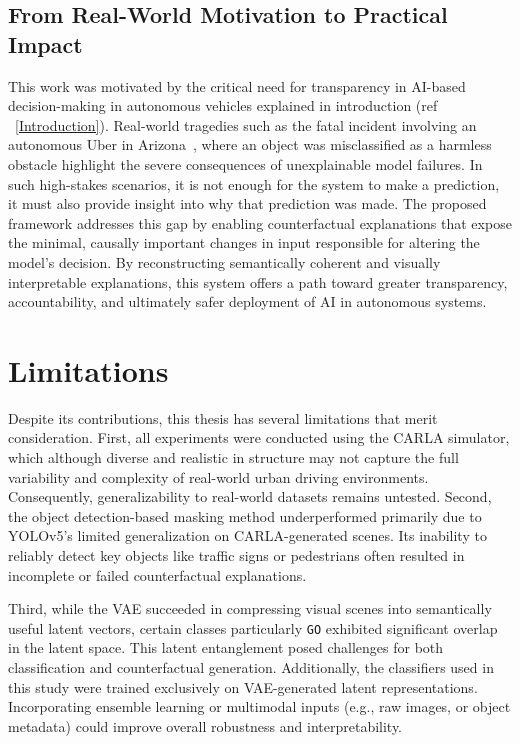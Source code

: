 \subsection{From Real-World Motivation to Practical Impact}
This work was motivated by the critical need for transparency in AI-based decision-making in autonomous vehicles explained in introduction (ref ~\ref{Introduction}). Real-world tragedies such as the fatal incident involving an autonomous Uber in Arizona~\autocite{marshall2019uber}, where an object was misclassified as a harmless obstacle highlight the severe consequences of unexplainable model failures. In such high-stakes scenarios, it is not enough for the system to make a prediction, it must also provide insight into why that prediction was made. The proposed framework addresses this gap by enabling counterfactual explanations that expose the minimal, causally important changes in input responsible for altering the model's decision. By reconstructing semantically coherent and visually interpretable explanations, this system offers a path toward greater transparency, accountability, and ultimately safer deployment of AI in autonomous systems.




\section{Limitations} \label{sec:limitations}
Despite its contributions, this thesis has several limitations that merit consideration. First, all experiments were conducted using the CARLA simulator, which although diverse and realistic in structure may not capture the full variability and complexity of real-world urban driving environments. Consequently, generalizability to real-world datasets remains untested. Second, the object detection-based masking method underperformed primarily due to YOLOv5’s limited generalization on CARLA-generated scenes. Its inability to reliably detect key objects like traffic signs or pedestrians often resulted in incomplete or failed counterfactual explanations.

Third, while the VAE succeeded in compressing visual scenes into semantically useful latent vectors, certain classes particularly \texttt{GO} exhibited significant overlap in the latent space. This latent entanglement posed challenges for both classification and counterfactual generation. Additionally, the classifiers used in this study were trained exclusively on VAE-generated latent representations. Incorporating ensemble learning or multimodal inputs (e.g., raw images, or object metadata) could improve overall robustness and interpretability.

